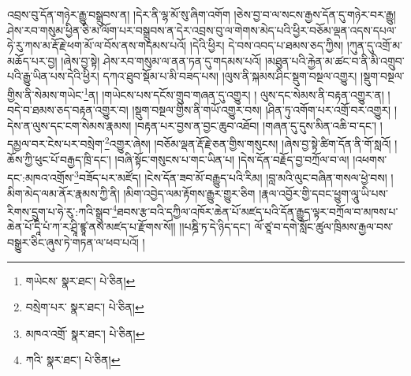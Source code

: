 འབྲས་བུ་དོན་གཉེར་རྒྱུ་བསྒྲུབས་ན། །དེར་ནི་ལྷ་མོ་སུ་ཞིག་འགོག །ཅེས་བྱ་བ་ལ་སངས་རྒྱས་དོན་དུ་གཉེར་བར་རྒྱུ། ཤེས་རབ་གསུམ་ཕྱིན་ཅི་མ་ལོག་པར་བསྒྲུབས་ན་དེར་འབྲས་བུ་ལ་གེགས་མེད་པའི་ཕྱིར་བཅོམ་ལྡན་འདས་དཔལ་ཧེ་རུ་ཀས་མ་རྡོ་རྗེ་ཕག་མོ་ལ་བོས་ནས་གདམས་པའོ། །དེའི་ཕྱིར། དེ་བས་འབད་པ་ཐམས་ཅད་ཀྱིས། །ཀུན་དུ་འགྲོ་མ་མཆོད་པར་བྱ། །ཞེས་བྱ་སྟེ། ཤེས་རབ་གསུམ་ལ་ནན་ཏན་དུ་གདམས་པའོ། །མཐུན་པའི་རྐྱེན་མ་ཚང་བ་ནི་མི་འགྲུབ་པའི་རྒྱུ་ཡིན་པས་དེའི་ཕྱིར། དཀའ་ཐུབ་སྡོམ་པ་མི་བཟད་པས། །ལུས་ནི་སྐམས་ཤིང་སྡུག་བསྔལ་འགྱུར། །སྡུག་བསྔལ་གྱིས་ནི་སེམས་གཡེང་\footnote{གཡེངས་  སྣར་ཐང་།  པེ་ཅིན། }ན། །གཡེངས་པས་དངོས་གྲུབ་གཞན་དུ་འགྱུར། །
ལུས་དང་སེམས་ནི་བརྟན་འགྱུར་ན། །བདེ་བ་ཐམས་ཅད་བརྟན་འགྱུར་བ། །སྡུག་བསྔལ་གྱིས་ནི་གཡོ་འགྱུར་བས། །ཤིན་ཏུ་འགོག་པར་འགྲོ་བར་འགྱུར། །དེས་ན་ལུས་དང་ངག་སེམས་རྣམས། །བརྟན་པར་བྱས་ན་བྱང་ཆུབ་འཐོབ། །གཞན་དུ་དུས་མིན་འཆི་བ་དང་། །དམྱལ་བར་ངེས་པར་བསྲེག་\footnote{བསྲེག་པར་  སྣར་ཐང་།  པེ་ཅིན། }འགྱུར་ཞེས། །བཅོམ་ལྡན་རྡོ་རྗེ་ཅན་གྱིས་གསུངས། །ཞེས་བྱ་སྟེ་ཚིག་དོན་ནི་གོ་སླའོ། །ཆོས་ཀྱི་ཕུང་པོ་བརྒྱད་ཁྲི་དང་། །བཞི་སྟོང་གསུངས་པ་གང་ཡིན་པ། །དེས་དོན་བརྗོད་བྱ་བཀྲོལ་བ་ལ། །འཕགས་དང་:མཁའ་འགྲོས་\footnote{མཁའ་འགྲོ་  སྣར་ཐང་།  པེ་ཅིན། }བཟོད་པར་མཛོད། །ངེས་དོན་ཟབ་མོ་བརྒྱུད་པའི་རིམ། །བླ་མའི་ལུང་བཞིན་གསལ་ཕྱེ་བས། །མིག་མེད་ལམ་ནོར་རྣམས་ཀྱི་ནི། །མིག་འབྱེད་ལམ་རྟོགས་རྒྱུར་གྱུར་ཅིག །རྣལ་འབྱོར་གྱི་དབང་ཕྱུག་ལཱུ་ཡི་པས་རིགས་དྲུག་པ་ཧེ་རུ་:ཀའི་སྒྲུབ་\footnote{ཀའི་  སྣར་ཐང་།  པེ་ཅིན། }ཐབས་རྩ་བའི་དཀྱིལ་འཁོར་ཆེན་པོ་མཛད་པའི་དོན་རྒྱུད་ལྟར་བཀྲོལ་བ་མཁས་པ་ཆེན་པོ་དཱི་པཾ་ཀ་ར་ཤྲཱི་ཛྙཱ་ནས་མཛད་པ་རྫོགས་སོ།། །།པཎྜི་ཏ་དེ་ཉིད་དང་། ལོ་ཙཱ་བ་དགེ་སློང་ཚུལ་ཁྲིམས་རྒྱལ་བས་བསྒྱུར་ཅིང་ཞུས་ཏེ་གཏན་ལ་ཕབ་པའོ། ། 